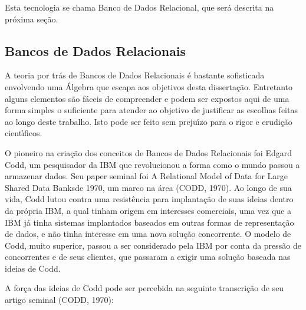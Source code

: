 \documentclass[
12pt,		%
openright,	%
twoside,  %
a4paper,			%
chapter=TITLE,		%
english,			%
french,				%
spanish,			%
brazil				%
]{USPSC-classe/USPSC}
\begin{document}
Esta tecnologia se chama \textquotedbl Banco de Dados Relacional\textquotedbl , que ser\'a descrita na pr\'oxima se\c{c}\~ao.









\subsection[Bancos de Dados Relacionais]{Bancos de Dados Relacionais}\label{Bancos de Dados Relacionais}
A teoria por tr\'as de Bancos de Dados Relacionais \'e bastante sofisticada envolvendo uma \'Algebra que escapa aos objetivos desta disserta\c{c}\~ao. Entretanto alguns elementos s\~ao f\'aceis de compreender e podem ser expostos aqui de uma forma simples o suficiente para atender ao objetivo de justificar as escolhas feitas ao longo deste trabalho. Isto pode ser feito sem preju\'{\i}zo para o rigor e erudi\c{c}\~ao cient\'{\i}ficos.









O pioneiro na cria\c{c}\~ao dos conceitos de Bancos de Dados Relacionais foi Edgard Codd, um pesquisador da IBM que revolucionou a forma como o mundo passou a armazenar dados. Seu paper seminal foi  \textquotedbl A Relational Model of Data for Large Shared Data Banks\textquotedbl  de 1970, um marco na \'area (CODD, 1970). Ao longo de sua vida, Codd lutou contra uma resist\^encia para implanta\c{c}\~ao de suas ideias dentro da pr\'opria IBM, a qual tinham origem em interesses comerciais, uma vez que a IBM j\'a tinha sistemas implantados baseados em outras formas de representa\c{c}\~ao de dados, e n\~ao tinha interesse em uma nova solu\c{c}\~ao concorrente. O modelo de Codd, muito superior, passou a ser considerado pela IBM por conta da press\~ao de concorrentes e de seus clientes, que passaram a exigir uma solu\c{c}\~ao baseada nas ideias de Codd.









A for\c{c}a das ideias de Codd pode ser percebida na seguinte transcri\c{c}\~ao de seu artigo seminal (CODD, 1970):
\end{document}
